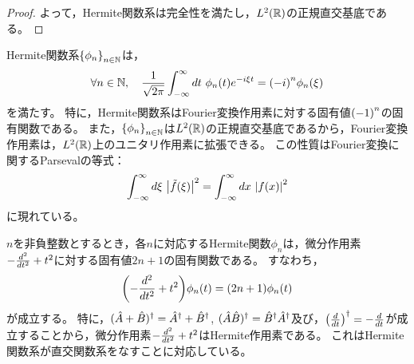 \documentclass[a4paper,draft]{ltjsarticle}
\begin{document}
\begin{thm}[Hermite関数系の完全性]
\begin{proof}
        よって，Hermite関数系は完全性を満たし，$\fun{L^2}{\R}$の正規直交基底である。
    \end{proof}
\end{thm}

\begin{supple}[Hermite関数のFourier変換]\label{Hermite:Fourier}
    Hermite関数系$\seq{\phi_n}{n\in\N}$は，
    \begin{equation}
        \forall n\in\N,\quad \dfrac{1}{\sqrt{2\pi}}\int_{-\infty}^\infty dt\ \fun{\phi_n}{t}e^{-i\xi t}=\pare{-i}^n \fun{\phi_n}{\xi}
    \end{equation}
    を満たす。
    特に，Hermite関数系はFourier変換作用素に対する固有値$\pare{-1}^n$の固有関数である。
    また，$\seq{\phi_n}{n\in\N}$は$\fun{L^2}{\R}$の正規直交基底であるから，Fourier変換作用素は，$\fun{L^2}{\R}$上のユニタリ作用素に拡張できる。
    この性質はFourier変換に関するParsevalの等式：
    \begin{equation}
        \int_{-\infty}^\infty d\xi\ \abs{\fun{\tilde{f}}{\xi}}^2
        = \int_{-\infty}^\infty dx\ \abs{\fun{f}{x}}^2
    \end{equation}
    に現れている。
\end{supple}

\begin{supple}[Hermite関数の満たす微分方程式]
    $n$を非負整数とするとき，各$n$に対応するHermite関数$\phi_n$は，微分作用素$-\frac{d^{2} }{d t^{2}}+t^2$に対する固有値$2n+1$の固有関数である。
    すなわち，
    \begin{equation}
        \pare{-\diffn{}{t}{2}+t^2}\fun{\phi_n}{t}=\pare{2n+1}\fun{\phi_n}{t}
    \end{equation}
    が成立する。
    特に，$( \hat{A}+\hat{B} )^\dagger=\hat{A}^\dagger+\hat{B}^\dagger$, $( \hat{A}\hat{B} )^\dagger=\hat{B}^\dagger\hat{A}^\dagger$及び，$\pare{\diff{}{t}}^\dagger=-\diff{}{t}$が成立することから，微分作用素$-\frac{d^{2} }{d t^{2}}+t^2$はHermite作用素である。
    これはHermite関数系が直交関数系をなすことに対応している。
\end{supple}
\end{document}
